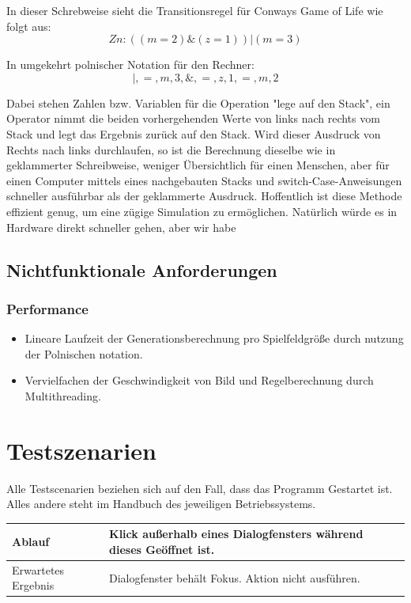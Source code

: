\documentclass[11pt,a4paper]{article}
\begin{document}
\par
In dieser Schrebweise sieht die Transitionsregel für Conways Game of Life wie folgt aus:
\[Zn : ((m=2)\&(z=1))|(m=3) \]
\par
In umgekehrt polnischer Notation für den Rechner:
\[|,=,m,3,\&,=,z,1,=,m,2\]
\par
Dabei stehen Zahlen bzw. Variablen für die Operation "lege auf den Stack", ein Operator nimmt die beiden vorhergehenden Werte von links nach rechts vom Stack und legt das Ergebnis zurück auf den Stack.
Wird dieser Ausdruck von Rechts nach links durchlaufen, so ist die Berechnung dieselbe wie in geklammerter Schreibweise, weniger Übersichtlich für einen Menschen, aber für einen Computer mittels eines nachgebauten Stacks und switch-Case-Anweisungen schneller ausführbar als der geklammerte Ausdruck. Hoffentlich ist diese Methode effizient genug, um eine zügige Simulation zu ermöglichen. Natürlich würde es in Hardware direkt schneller gehen, aber wir habe

 
\subsection{Nichtfunktionale Anforderungen}
\subsubsection{Performance}
\begin{itemize}
    \item Lineare Laufzeit der Generationsberechnung pro Spielfeldgröße durch nutzung der Polnischen notation.
    \item Vervielfachen der Geschwindigkeit von Bild und Regelberechnung durch Multithreading.
\end{itemize}

\pagebreak

\section{Testszenarien}
Alle Testscenarien beziehen sich auf den Fall, dass das Programm Gestartet ist. Alles andere steht im Handbuch des jeweiligen Betriebssystems.

\begin{longtable}[m]{|m{3cm}|m{10cm}|}
\hline
Ablauf&Klick außerhalb eines Dialogfensters während dieses Geöffnet ist.\\
\hline
Erwartetes Ergebnis&Dialogfenster behält Fokus. Aktion nicht ausführen.\\
\hline
\end{longtable}
\end{document}
